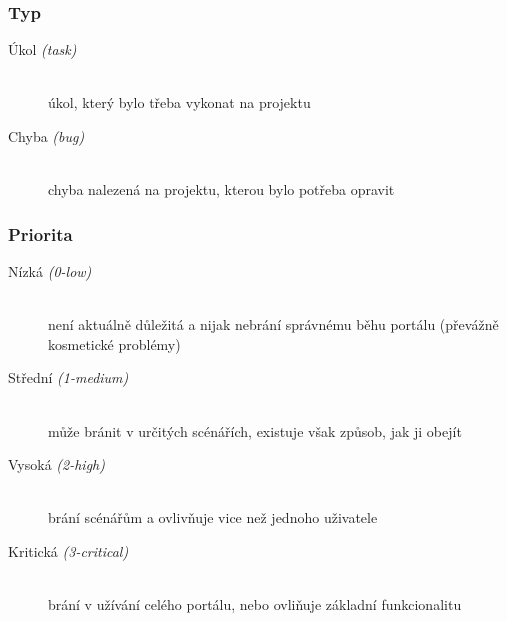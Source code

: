 \subsubsection*{Typ}
\begin{description}
  \item[Úkol \emph{(task)}] \hfill \\
    úkol, který bylo třeba vykonat na projektu
  \item[Chyba \emph{(bug)}] \hfill \\
    chyba nalezená na projektu, kterou bylo potřeba opravit
\end{description}

\subsubsection*{Priorita}
\begin{description}
	\item[Nízká \emph{(0-low)}] \hfill \\
	  není aktuálně důležitá a nijak nebrání správnému běhu portálu (převážně kosmetické problémy)
	\item[Střední \emph{(1-medium)}] \hfill \\
	  může bránit v určitých scénářích, existuje však způsob, jak ji obejít
	\item[Vysoká  \emph{(2-high)}] \hfill \\
	  brání scénářům a ovlivňuje vice než jednoho uživatele 
	\item[Kritická \emph{(3-critical)}] \hfill \\
	  brání v užívání celého portálu, nebo ovliňuje základní funkcionalitu
\end{description}

